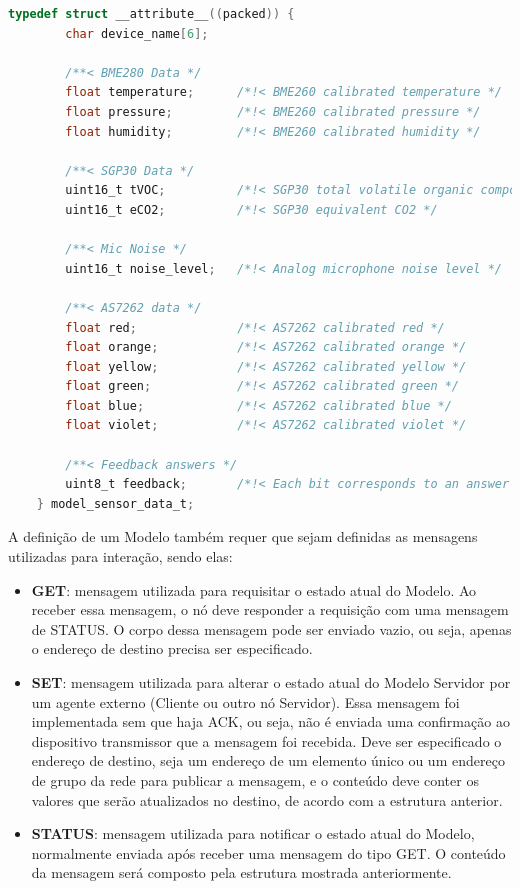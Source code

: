 \documentclass[../monografia.tex]{subfiles}
\begin{document}
\begin{lstlisting}[basicstyle=\tiny,language=C,]
	typedef struct __attribute__((packed)) {
		char device_name[6];
		
		/**< BME280 Data */
		float temperature;      /*!< BME260 calibrated temperature */
		float pressure;         /*!< BME260 calibrated pressure */
		float humidity;         /*!< BME260 calibrated humidity */
	
		/**< SGP30 Data */
		uint16_t tVOC;          /*!< SGP30 total volatile organic compound */
		uint16_t eCO2;          /*!< SGP30 equivalent CO2 */
	
		/**< Mic Noise */
		uint16_t noise_level;   /*!< Analog microphone noise level */
	
		/**< AS7262 data */
		float red;              /*!< AS7262 calibrated red */
		float orange;           /*!< AS7262 calibrated orange */
		float yellow;           /*!< AS7262 calibrated yellow */
		float green;            /*!< AS7262 calibrated green */
		float blue;             /*!< AS7262 calibrated blue */
		float violet;           /*!< AS7262 calibrated violet */
	
		/**< Feedback answers */
		uint8_t feedback;       /*!< Each bit corresponds to an answer */
	} model_sensor_data_t; 
\end{lstlisting}

A definição de um Modelo também requer que sejam definidas as mensagens utilizadas para interação, sendo elas:

\begin{itemize}
	\item \textbf{GET}: mensagem utilizada para requisitar o estado atual do Modelo. Ao receber essa mensagem, o nó deve responder a requisição com uma mensagem de STATUS. O corpo dessa mensagem pode ser enviado vazio, ou seja, apenas o endereço de destino precisa ser especificado.
	\item \textbf{SET}: mensagem utilizada para alterar o estado atual do Modelo Servidor por um agente externo (Cliente ou outro nó Servidor). Essa mensagem foi implementada sem que haja ACK, ou seja, não é enviada uma confirmação ao dispositivo transmissor que a mensagem foi recebida. Deve ser especificado o endereço de destino, seja um endereço de um elemento único ou um endereço de grupo da rede para publicar a mensagem, e o conteúdo deve conter os valores que serão atualizados no destino, de acordo com a estrutura anterior.
	\item \textbf{STATUS}: mensagem utilizada para notificar o estado atual do Modelo, normalmente enviada após receber uma mensagem do tipo GET. O conteúdo da mensagem será composto pela estrutura mostrada anteriormente.
\end{itemize}
\end{document}

